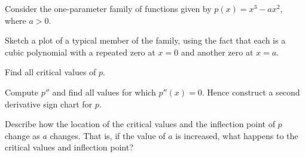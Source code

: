 \begin{exercises} 
\item Consider the one-parameter family of functions given by $p(x) = x^3-ax^2$, where $a>0$.
\ba
	\item Sketch a plot of a typical member of the family, using the fact that each is a cubic polynomial with a repeated zero at $x = 0$ and another zero at $x = a$.
	\item Find all critical values of $p$.
	\item Compute $p''$ and find all values for which $p''(x) = 0$.  Hence construct a second derivative sign chart for $p$.
	\item Describe how the location of the critical values and the inflection point of $p$ change as $a$ changes.  That is, if the value of $a$ is increased, what happens to the critical values and inflection point?
\ea


\end{exercises}
